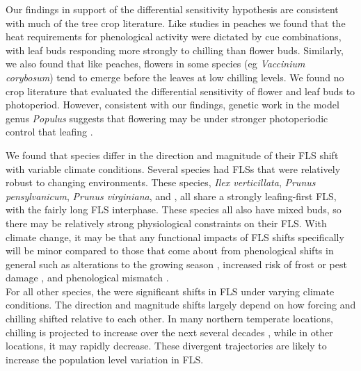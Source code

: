\documentclass[11pt]{article}
\begin{document}
\noindent Our findings in support of the differential sensitivity hypothesis are consistent with much of the tree crop literature. Like studies in peaches \citep{Garigalio20106,Citidin2001} we found that the heat requirements for phenological activity were dictated by cue combinations, with leaf buds responding more strongly to chilling than flower buds. Similarly, we also found that like peaches, flowers in some species (eg \textit{Vaccinium corybosum}) tend to emerge before the leaves at low chilling levels. We found no crop literature that evaluated the differential sensitivity of flower and leaf buds to photoperiod. However, consistent with our findings, genetic work in the model genus \textit{Populus} suggests that flowering may be under stronger photoperiodic control that leafing \citep{}.

\noindent We found that species differ in the direction and magnitude of their FLS shift with variable climate conditions. Several species had FLSs that were relatively robust to changing environments. These species, \textit{Ilex verticillata}, \textit{Prunus pensylvanicum}, \textit{Prunus virginiana}, and , all share a strongly leafing-first FLS, with the  fairly long FLS interphase. These species all also have mixed buds, so there may be relatively strong physiological constraints on their FLS. With climate change, it may be that any functional impacts of FLS shifts specifically will be minor compared to those that come about from phenological shifts in general such as alterations to the growing season \citep{}, increased risk of frost or pest damage \citep{}, and phenological mismatch \citep{}. \\

For all other species, the were significant shifts in FLS under varying climate conditions. The direction and magnitude shifts largely depend on how forcing and chilling shifted relative to each other. In many northern temperate locations, chilling is projected to increase over the next several decades \citep{Ettinger}, while in other locations, it may rapidly decrease. These divergent trajectories are likely to increase the population level variation in FLS.\\
\end{document}
